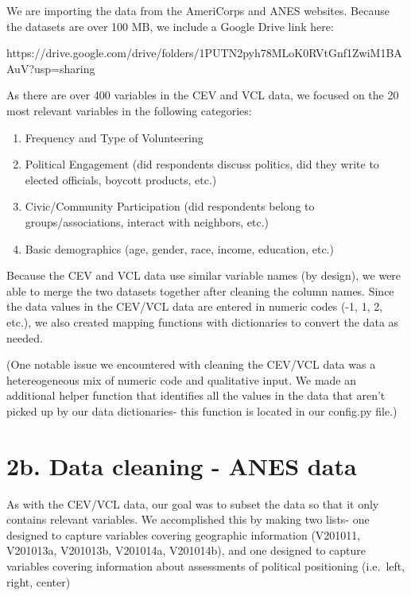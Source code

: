 \documentclass[
  letterpaper,
  DIV=11,
  numbers=noendperiod]{scrartcl}
\providecommand{\tightlist}{%
  \setlength{\itemsep}{0pt}\setlength{\parskip}{0pt}}\usepackage{longtable,booktabs,array}
\begin{document}
We are importing the data from the AmeriCorps and ANES websites. Because
the datasets are over 100 MB, we include a Google Drive link here:

https://drive.google.com/drive/folders/1PUTN2pyh78MLoK0RVtGnf1ZwiM1BAAuV?usp=sharing

As there are over 400 variables in the CEV and VCL data, we focused on
the 20 most relevant variables in the following categories:

\begin{enumerate}
\def\labelenumi{\arabic{enumi}.}
\tightlist
\item
  Frequency and Type of Volunteering
\item
  Political Engagement (did respondents discuss politics, did they write
  to elected officials, boycott products, etc.)
\item
  Civic/Community Participation (did respondents belong to
  groups/associations, interact with neighbors, etc.)
\item
  Basic demographics (age, gender, race, income, education, etc.)
\end{enumerate}

Because the CEV and VCL data use similar variable names (by design), we
were able to merge the two datasets together after cleaning the column
names. Since the data values in the CEV/VCL data are entered in numeric
codes (-1, 1, 2, etc.), we also created mapping functions with
dictionaries to convert the data as needed.

(One notable issue we encountered with cleaning the CEV/VCL data was a
hetereogeneous mix of numeric code and qualitative input. We made an
additional helper function that identifies all the values in the data
that aren't picked up by our data dictionaries- this function is located
in our config.py file.)

\section{2b. Data cleaning - ANES
data}\label{b.-data-cleaning---anes-data}

As with the CEV/VCL data, our goal was to subset the data so that it
only contains relevant variables. We accomplished this by making two
lists- one designed to capture variables covering geographic information
(V201011, V201013a, V201013b, V201014a, V201014b), and one designed to
capture variables covering information about assessments of political
positioning (i.e.~left, right, center)
\end{document}
